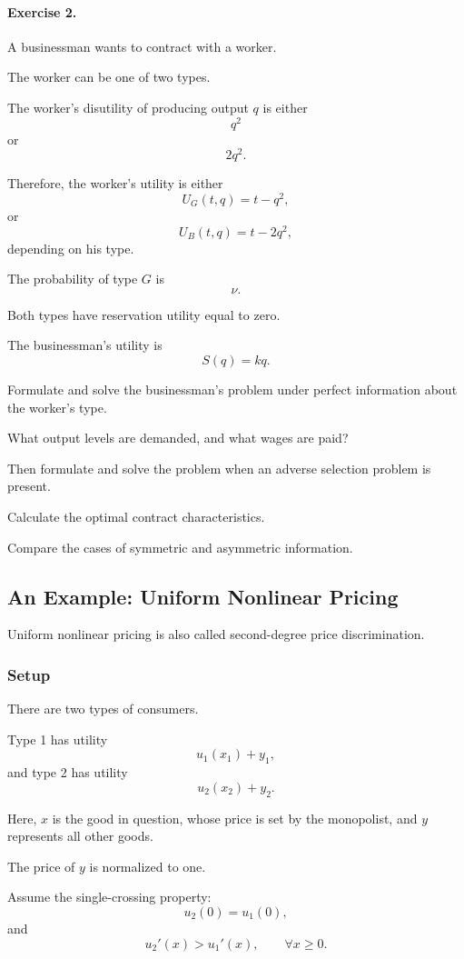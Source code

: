 \paragraph{Exercise 2.}

A businessman wants to contract with a worker.

The worker can be one of two types.

The worker's disutility of producing output \(q\) is either
\[
q^2
\]
or
\[
2q^2.
\]

Therefore, the worker's utility is either
\[
U_G(t,q)=t-q^2,
\]
or
\[
U_B(t,q)=t-2q^2,
\]
depending on his type.

The probability of type \(G\) is
\[
\nu.
\]

Both types have reservation utility equal to zero.

The businessman's utility is
\[
S(q)=kq.
\]

Formulate and solve the businessman's problem under perfect information about the worker's type.

What output levels are demanded, and what wages are paid?

Then formulate and solve the problem when an adverse selection problem is present.

Calculate the optimal contract characteristics.

Compare the cases of symmetric and asymmetric information.




\subsection{An Example: Uniform Nonlinear Pricing}

Uniform nonlinear pricing is also called second-degree price discrimination.

\subsubsection{Setup}

There are two types of consumers.

Type 1 has utility
\[
u_1(x_1)+y_1,
\]
and type 2 has utility
\[
u_2(x_2)+y_2.
\]

Here, \(x\) is the good in question, whose price is set by the monopolist, and \(y\) represents all other goods.

The price of \(y\) is normalized to one.

Assume the single-crossing property:
\[
u_2(0)=u_1(0),
\]
and
\[
u_2'(x)>u_1'(x),
\qquad
\forall x\ge 0.
\]

